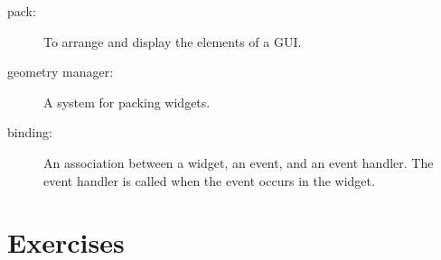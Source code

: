 \documentclass[10pt]{book}
\begin{document}
\begin{description}
\item[pack:] To arrange and display the elements of a GUI.

\item[geometry manager:] A system for packing widgets.

\item[binding:] An association between a widget, an event, and
an event handler.  The event handler is called when the event
occurs in the widget.

\end{description}


\section{Exercises}
\end{document}
